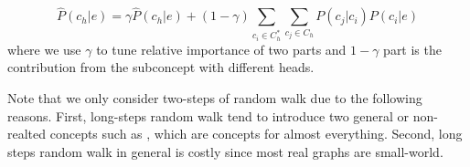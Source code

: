 \begin{equation}
\hat{P}({c_h}|e) = \gamma \hat{P}({c_h}|e)+ (1-\gamma) \sum_{c_i\in C^*_h}\sum_{ c_j\in C_h} P(c_j|c_i) P(c_i|e)
\label{eq:pgge}
\end{equation}
where we use $\gamma$ to tune relative importance of two parts and $1-\gamma$ part is the contribution from the subconcept with different heads.


Note that we only consider two-steps of random walk due to the following reasons. 
First, long-steps random walk tend to introduce two general or non-realted concepts such as , which are concepts for almost everything.
Second, long steps random walk in general is costly since most real graphs are small-world.

%
%

